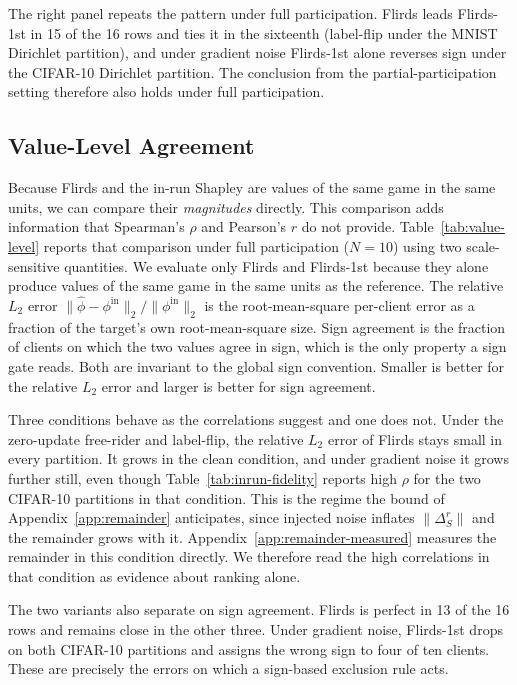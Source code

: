 \documentclass[letterpaper]{article} %
\theoremstyle{definition}
\begin{document}
The right panel repeats the pattern under full participation. Flirds leads
Flirds-1st in 15 of the 16 rows and ties it in the sixteenth (label-flip
under the MNIST Dirichlet partition), and under gradient noise Flirds-1st
alone reverses sign under the CIFAR-10 Dirichlet partition. The conclusion
from the partial-participation setting therefore also holds under full
participation.

\subsection{Value-Level Agreement}
\label{app:value-level}

Because Flirds and the in-run Shapley are values of the same game in the same
units, we can compare their \emph{magnitudes} directly. This comparison adds
information that Spearman's $\rho$ and Pearson's $r$ do not provide.
Table~\ref{tab:value-level} reports that comparison under full participation
($N{=}10$) using two scale-sensitive quantities. We evaluate only Flirds and
Flirds-1st because they alone produce values of the same game in the same
units as the reference. The relative $L_2$ error
$\|\hat\phi - \phi^{\mathrm{in}}\|_2 / \|\phi^{\mathrm{in}}\|_2$ is the
root-mean-square per-client error as a fraction of the target's own
root-mean-square size. Sign agreement is the fraction of clients on which the
two values agree in sign, which is the only property a sign gate reads.
Both are invariant to the global sign convention. Smaller is better for the
relative $L_2$ error and larger is better for sign agreement.

Three conditions behave as the correlations suggest and one does not. Under
the zero-update free-rider and label-flip, the relative $L_2$ error of Flirds
stays small in every partition. It grows in the clean condition, and under
gradient noise it grows further still, even though
Table~\ref{tab:inrun-fidelity} reports high $\rho$ for the two CIFAR-10
partitions in that condition. This is the regime
the bound of Appendix~\ref{app:remainder} anticipates, since
injected noise inflates $\|\Delta_S^r\|$ and the remainder grows with it.
Appendix~\ref{app:remainder-measured} measures the remainder in
this condition directly. We therefore read the high correlations in that
condition as evidence about ranking alone.

The two variants also separate on sign agreement. Flirds is perfect in 13 of
the 16 rows and remains close in the other three. Under gradient noise,
Flirds-1st drops on both CIFAR-10 partitions and assigns the wrong sign to four
of ten clients. These are precisely the errors on which a sign-based exclusion
rule acts.
\end{document}
